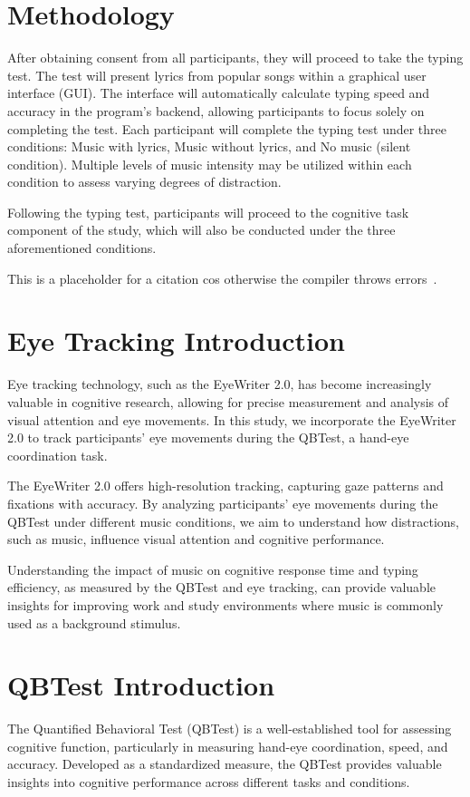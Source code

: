 \documentclass[manuscript, screen, review]{acmart} %
\begin{document}
\section{Methodology}
After obtaining consent from all participants, they will proceed to take the typing test. The test will present lyrics from popular songs within a graphical user interface (GUI). The interface will automatically calculate typing speed and accuracy in the program's backend, allowing participants to focus solely on completing the test. Each participant will complete the typing test under three conditions: Music with lyrics, Music without lyrics, and No music (silent condition).
Multiple levels of music intensity may be utilized within each condition to assess varying degrees of distraction.

Following the typing test, participants will proceed to the cognitive task component of the study, which will also be conducted under the three aforementioned conditions. %

This is a placeholder for a citation cos otherwise the compiler throws errors~\cite{AudioDistractionsAshley}.

\section{Eye Tracking Introduction}
Eye tracking technology, such as the EyeWriter 2.0, has become increasingly valuable in cognitive research, allowing for precise measurement and analysis of visual attention and eye movements. In this study, we incorporate the EyeWriter 2.0 to track participants' eye movements during the QBTest, a hand-eye coordination task.

The EyeWriter 2.0 offers high-resolution tracking, capturing gaze patterns and fixations with accuracy. By analyzing participants' eye movements during the QBTest under different music conditions, we aim to understand how distractions, such as music, influence visual attention and cognitive performance.

Understanding the impact of music on cognitive response time and typing efficiency, as measured by the QBTest and eye tracking, can provide valuable insights for improving work and study environments where music is commonly used as a background stimulus.

\section{QBTest Introduction}
The Quantified Behavioral Test (QBTest) is a well-established tool for assessing cognitive function, particularly in measuring hand-eye coordination, speed, and accuracy. Developed as a standardized measure, the QBTest provides valuable insights into cognitive performance across different tasks and conditions.
\end{document}
